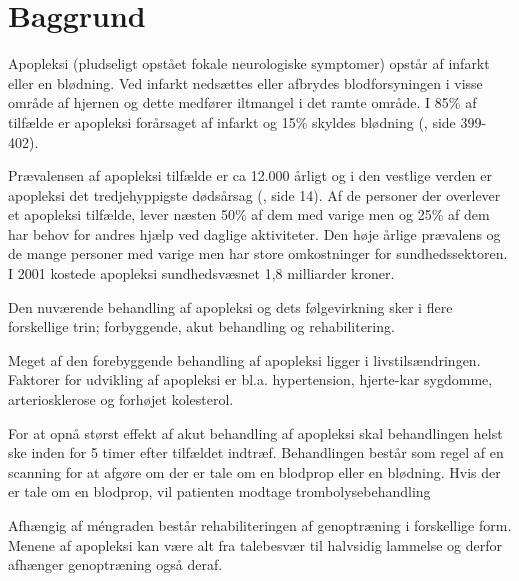 \chapter{Baggrund} \label{chap:Baggrund}

Apopleksi (pludseligt opstået fokale neurologiske symptomer) opstår af infarkt eller en blødning. Ved infarkt nedsættes eller afbrydes blodforsyningen i visse område af hjernen og dette medfører iltmangel i det ramte område. I 85\% af tilfælde er apopleksi forårsaget af infarkt og 15\% skyldes blødning (\cite{RefWorks:32}, side 399-402).

Prævalensen af apopleksi tilfælde er ca 12.000 årligt og i den vestlige verden er apopleksi det tredjehyppigste dødsårsag (\cite{RefWorks:21}, side 14). Af de personer der overlever et apopleksi tilfælde, lever næsten 50\% af dem med varige men og 25\% af dem har behov for andres hjælp ved daglige aktiviteter.  Den høje årlige prævalens og de mange personer med varige men har store omkostninger for sundhedssektoren.  I 2001 kostede apopleksi sundhedsvæsnet 1,8 milliarder kroner. 

Den nuværende behandling af apopleksi og dets følgevirkning sker i flere forskellige trin; forbyggende, akut behandling og rehabilitering. 

Meget af den forebyggende behandling af apopleksi ligger i livstilsændringen. Faktorer for udvikling af apopleksi er bl.a. hypertension, hjerte-kar sygdomme, arteriosklerose og forhøjet kolesterol. 

For at opnå størst effekt af akut behandling af apopleksi skal behandlingen helst ske inden for 5 timer efter tilfældet indtræf. Behandlingen består som regel af en scanning for at afgøre om der er tale om en blodprop eller en blødning. Hvis der er tale om en blodprop, vil patienten modtage trombolysebehandling 

Afhængig af méngraden består rehabiliteringen af genoptræning i forskellige form. Menene af apopleksi kan være alt fra talebesvær til halvsidig lammelse og derfor afhænger genoptræning også deraf. 

